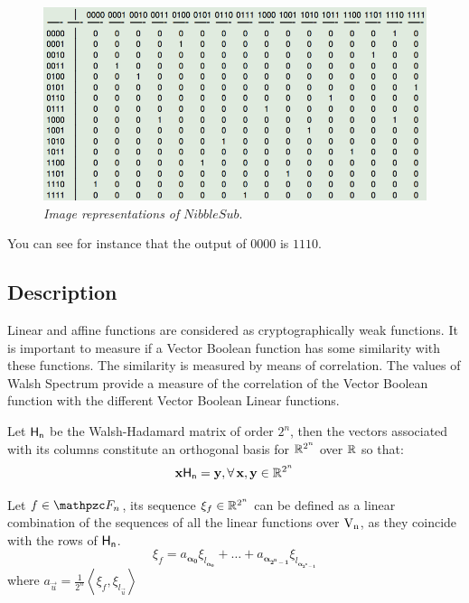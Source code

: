 \begin{example}
\begin{figure}[htbp!]
\centering
\includegraphics[width=\textwidth]{image}
\caption[Image representations of $NibbleSub$]{\textit{Image representations of }$NibbleSub$.}
\label{fig:image}
\end{figure}

You can see for instance that the output of $0000$ is $1110$.
\end{example}

\subsection{Description}

Linear and affine functions are considered as cryptographically weak functions. It is important to measure if a Vector Boolean function has some similarity with these functions. The similarity is measured by means of correlation. The values of Walsh Spectrum provide a measure of the correlation of the Vector Boolean function with the different Vector Boolean Linear functions. 

\begin{theorem}
Let $\matr{H_n}$ be the Walsh-Hadamard matrix of order $2^n$, then the vectors associated with its columns constitute an orthogonal basis for $\bbbr^{2^n}$ over $\bbbr$ so that:
\begin{equation}
\vec{x} \matr{H_n} = \vec{y} , \fa \vec{x}, \vec{y} \in \bbbr^{2^n} 
\end{equation}
\end{theorem}

\begin{corollary}
Let $f \in \funct{F}_n$, its sequence $\xi_f \in \bbbr^{2^n}$ can be defined as a linear combination of the sequences of all the linear functions over $\gf{V_n}$, as they coincide with the rows of $\matr{H_n}$.
\begin{equation}
\xi_f = a_{\boldsymbol{\alpha_{0}}} \xi_{l_{\boldsymbol{\alpha_{0}}}} + \dots + a_{\boldsymbol{\alpha_{2^n-1}}} \xi_{l_{\boldsymbol{\alpha_{2^n-1}}}}  
\end{equation}
where $a_{\vec{u}} = \frac{1}{2^n} \left\langle \xi_f, \xi_{l_{\vec{u}}} \right\rangle$
\end{corollary}

